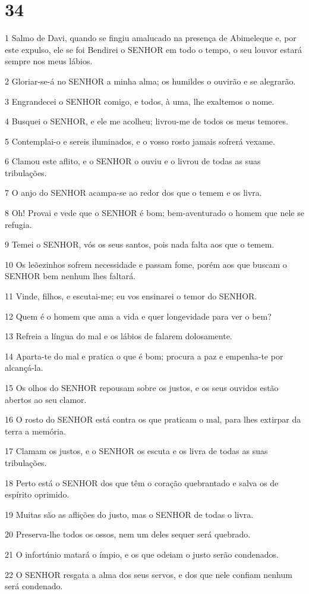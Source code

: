 \chapter{34}

\par 1 Salmo de Davi, quando se fingiu amalucado na presença de Abimeleque e, por este expulso, ele se foi Bendirei o SENHOR em todo o tempo, o seu louvor estará sempre nos meus lábios.
\par 2 Gloriar-se-á no SENHOR a minha alma; os humildes o ouvirão e se alegrarão.
\par 3 Engrandecei o SENHOR comigo, e todos, à uma, lhe exaltemos o nome.
\par 4 Busquei o SENHOR, e ele me acolheu; livrou-me de todos os meus temores.
\par 5 Contemplai-o e sereis iluminados, e o vosso rosto jamais sofrerá vexame.
\par 6 Clamou este aflito, e o SENHOR o ouviu e o livrou de todas as suas tribulações.
\par 7 O anjo do SENHOR acampa-se ao redor dos que o temem e os livra.
\par 8 Oh! Provai e vede que o SENHOR é bom; bem-aventurado o homem que nele se refugia.
\par 9 Temei o SENHOR, vós os seus santos, pois nada falta aos que o temem.
\par 10 Os leõezinhos sofrem necessidade e passam fome, porém aos que buscam o SENHOR bem nenhum lhes faltará.
\par 11 Vinde, filhos, e escutai-me; eu vos ensinarei o temor do SENHOR.
\par 12 Quem é o homem que ama a vida e quer longevidade para ver o bem?
\par 13 Refreia a língua do mal e os lábios de falarem dolosamente.
\par 14 Aparta-te do mal e pratica o que é bom; procura a paz e empenha-te por alcançá-la.
\par 15 Os olhos do SENHOR repousam sobre os justos, e os seus ouvidos estão abertos ao seu clamor.
\par 16 O rosto do SENHOR está contra os que praticam o mal, para lhes extirpar da terra a memória.
\par 17 Clamam os justos, e o SENHOR os escuta e os livra de todas as suas tribulações.
\par 18 Perto está o SENHOR dos que têm o coração quebrantado e salva os de espírito oprimido.
\par 19 Muitas são as aflições do justo, mas o SENHOR de todas o livra.
\par 20 Preserva-lhe todos os ossos, nem um deles sequer será quebrado.
\par 21 O infortúnio matará o ímpio, e os que odeiam o justo serão condenados.
\par 22 O SENHOR resgata a alma dos seus servos, e dos que nele confiam nenhum será condenado.

